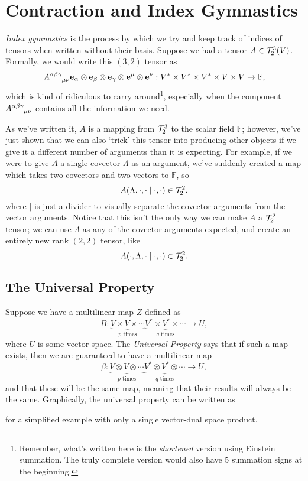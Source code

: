 \chapter{Contraction and Index Gymnastics}
\emph{Index gymnastics} is the process by which we try and keep track of indices of tensors when written without their basis.
Suppose we had a tensor $A \in \mathcal{T}^3_2(V)$.
Formally, we would write this $(3,2)$ tensor as
\[ \tensor{A}{^{\alpha\beta\gamma}_{\mu\nu}} \vec{e}_\alpha \otimes \vec{e}_\beta \otimes \vec{e}_\gamma \otimes \vec{e}^\mu \otimes \vec{e}^\nu : V^* \times V^* \times V^* \times V \times V \to \mathbb{F}, \]
which is kind of ridiculous to carry around\footnote{Remember, what's written here is the \emph{shortened} version using Einstein summation. The truly complete version would also have 5 summation signs at the beginning.}, especially when the component $\tensor{A}{^{\alpha\beta\gamma}_{\mu\nu}}$ contains all the information we need.

As we've written it, $A$ is a mapping from $\mathcal{T}^3_2$ to the scalar field $\mathbb{F}$; however, we've just shown that we can also `trick' this tensor into producing other objects if we give it a different number of arguments than it is expecting.
For example, if we were to give $A$ a single covector $\Lambda$ as an argument, we've suddenly created a map which takes two covectors and two vectors to $\mathbb{F}$, so 
\[ A(\Lambda,\cdot,\cdot\mid\cdot,\cdot) \in \mathcal{T}^2_2, \]
where $\mid$ is just a divider to visually separate the covector arguments from the vector arguments.
Notice that this isn't the only way we can make $A$ a $\mathcal{T}^2_2$ tensor; we can use $\Lambda$ as any of the covector arguments expected, and create an entirely new rank $(2,2)$ tensor, like
\[ A(\cdot,\Lambda,\cdot\mid\cdot,\cdot) \in \mathcal{T}^2_2. \]

\section{The Universal Property}
Suppose we have a multilinear map $Z$ defined as
\[ B : \underbrace{V \times V \times \cdots}_{\text{$p$ times}}\underbrace{V^* \times V^* \times \cdots}_{\text{$q$ times}} \to U, \]
where $U$ is some vector space.
The \emph{Universal Property} says that if such a map exists, then we are guaranteed to have a multilinear map
\[ \beta : \underbrace{V \otimes V \otimes \cdots}_{\text{$p$ times}}\underbrace{V^* \otimes V^* \otimes \cdots}_{\text{$q$ times}} \to U, \]
and that these will be the same map, meaning that their results will always be the same.
Graphically, the universal property can be written as
\begin{center}
\end{center}
for a simplified example with only a single vector-dual space product.


